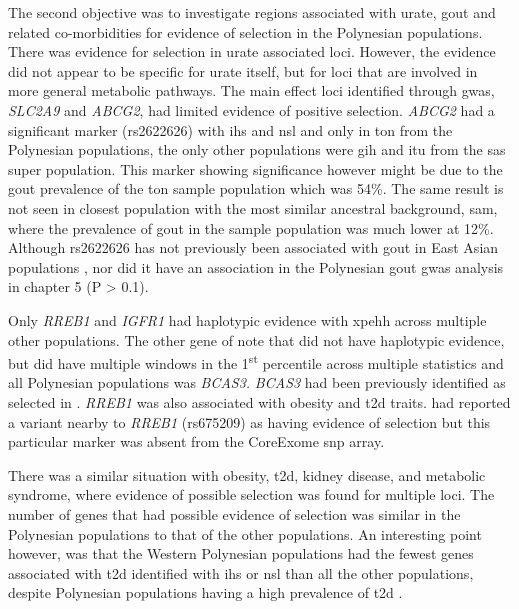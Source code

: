 \documentclass[]{report}
\begin{document}
The second objective was to investigate regions associated with urate,
gout and related co-morbidities for evidence of selection in the
Polynesian populations. There was evidence for selection in urate
associated loci. However, the evidence did not appear to be specific for
urate itself, but for loci that are involved in more general metabolic
pathways. The main effect loci identified through \gls{gwas},
\emph{SLC2A9} and \emph{ABCG2}, had limited evidence of positive
selection. \emph{ABCG2} had a significant marker (rs2622626) with
\gls{ihs} and \gls{nsl} and only in \gls{ton} from the Polynesian
populations, the only other populations were \gls{gih} and \gls{itu}
from the \gls{sas} super population. This marker showing significance
however might be due to the gout prevalence of the \gls{ton} sample
population which was 54\%. The same result is not seen in closest
population with the most similar ancestral background, \gls{sam}, where
the prevalence of gout in the sample population was much lower at 12\%.
Although rs2622626 has not previously been associated with gout in East
Asian populations \citep{zhang2016associations}, nor did it have an
association in the Polynesian gout \gls{gwas} analysis in chapter 5 (P
\textgreater{} 0.1).

Only \emph{RREB1} and \emph{IGFR1} had haplotypic evidence with
\gls{xpehh} across multiple other populations. The other gene of note
that did not have haplotypic evidence, but did have multiple windows in
the 1\textsuperscript{st} percentile across multiple statistics and all
Polynesian populations was \emph{BCAS3.} \emph{BCAS3} had been
previously identified as selected in \citet{Grossman2013}. \emph{RREB1}
was also associated with obesity and \gls{t2d} traits.
\citet{Zhang2013a} had reported a variant nearby to \emph{RREB1}
(rs675209) as having evidence of selection but this particular marker
was absent from the CoreExome \gls{snp} array.

There was a similar situation with obesity, \gls{t2d}, kidney disease,
and metabolic syndrome, where evidence of possible selection was found
for multiple loci. The number of genes that had possible evidence of
selection was similar in the Polynesian populations to that of the other
populations. An interesting point however, was that the Western
Polynesian populations had the fewest genes associated with \gls{t2d}
identified with \gls{ihs} or \gls{nsl} than all the other populations,
despite Polynesian populations having a high prevalence of \gls{t2d}
\citep{Winnard2013}.
\end{document}
